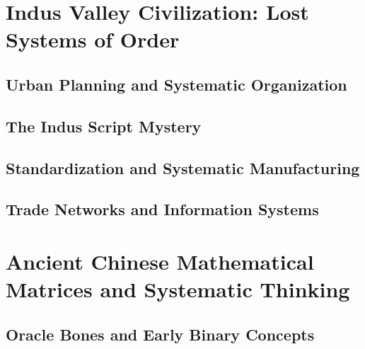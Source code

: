 \documentclass[12pt, oneside, openany]{book}
\let\oldchapter\chapter
\renewcommand{\chapter}{
	\cleardoublepage
	\thispagestyle{chapter}
	\oldchapter
}
\begin{document}
\chapter{Indus Valley Civilization: Lost Systems of Order}

\section{Urban Planning and Systematic Organization}

\section{The Indus Script Mystery}

\section{Standardization and Systematic Manufacturing}

\section{Trade Networks and Information Systems}


\chapter{Ancient Chinese Mathematical Matrices and Systematic Thinking}

\section{Oracle Bones and Early Binary Concepts}
\end{document}
